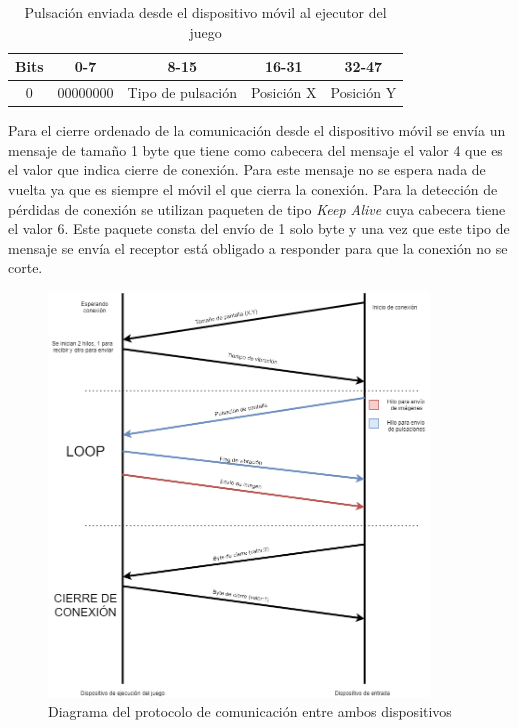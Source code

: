 \begin{table}[h!]
\centering
\begin{tabular}{|l|c|c|c|c|} 
\hline
Bits                    & 0-7               & 8-15                            & 16-31 & 32-47 \\ 
\hline
\multicolumn{1}{|c|}{0} & 00000000 & Tipo de pulsaci\'on & \multicolumn{1}{l|}{Posici\'on X} & \multicolumn{1}{l|}{Posici\'on Y}  \\
\hline
\end{tabular}
\caption{Pulsaci\'on enviada desde el dispositivo m\'ovil al ejecutor del juego}
\label{table:2}
\end{table}

Para el cierre ordenado de la comunicaci\'on desde el dispositivo m\'ovil se env\'ia un mensaje de tama\~no 1 byte que tiene como cabecera del mensaje el valor 4 que es el valor que indica cierre de conexi\'on. Para este mensaje no se espera nada de vuelta ya que es siempre el m\'ovil el que cierra la conexi\'on. Para la detecci\'on de p\'erdidas de conexi\'on se utilizan paqueten de tipo \textit{Keep Alive} cuya cabecera tiene el valor 6. Este paquete consta del env\'io de 1 solo byte y una vez que este tipo de mensaje se env\'ia el receptor est\'a obligado a responder para que la conexi\'on no se corte.

\begin{figure}[h]

\centering
\includegraphics[width=0.9\textwidth]{./Imagenes/Bitmap/Arquitectura}
\caption{Diagrama del protocolo de comunicaci\'on entre ambos dispositivos}
\end{figure}



